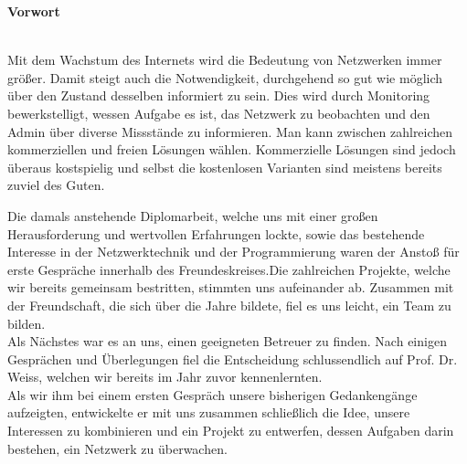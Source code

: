 \documentclass[12pt,a4paper]{report}
\begin{document}



\begin{onehalfspace}

\vspace{1.5cm}
\begin{Huge}
\textbf{Vorwort}
\end{Huge}
\vspace{2cm}
\\Mit dem Wachstum des Internets wird die Bedeutung von Netzwerken immer größer. Damit steigt auch die Notwendigkeit, durchgehend so gut wie möglich über den Zustand desselben informiert zu sein. Dies wird durch Monitoring bewerkstelligt, wessen Aufgabe es ist, das Netzwerk zu beobachten und den Admin über diverse Missstände zu informieren. Man kann zwischen zahlreichen kommerziellen und freien Lösungen wählen. Kommerzielle Lösungen sind jedoch überaus kostspielig und selbst die kostenlosen Varianten sind meistens bereits zuviel des Guten. 

Die damals anstehende Diplomarbeit, welche uns mit einer großen Herausforderung und wertvollen Erfahrungen lockte, sowie das bestehende Interesse in der Netzwerktechnik und der Programmierung waren der Anstoß für erste Gespräche innerhalb des Freundeskreises.Die zahlreichen Projekte, welche wir bereits gemeinsam bestritten, stimmten uns aufeinander ab. Zusammen mit der Freundschaft, die sich über die Jahre bildete, fiel es uns leicht, ein Team zu bilden.\\
Als Nächstes war es an uns, einen geeigneten Betreuer zu finden. Nach einigen Gesprächen und Überlegungen fiel die Entscheidung schlussendlich auf Prof. Dr. Weiss, welchen wir bereits im Jahr zuvor kennenlernten.\\
Als wir ihm bei einem ersten Gespräch unsere bisherigen Gedankengänge aufzeigten, entwickelte er mit uns zusammen schließlich die Idee, unsere Interessen zu kombinieren und ein Projekt zu entwerfen, dessen Aufgaben darin bestehen, ein Netzwerk zu überwachen.

\end{onehalfspace}
\begin{singlespace}
\tableofcontents
\newpage
\end{singlespace}
\pagestyle{fancy}
\end{document}
